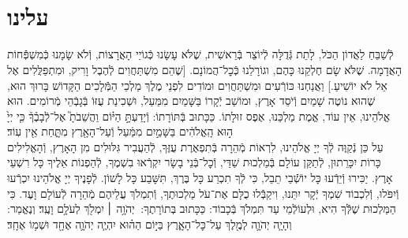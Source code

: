 \documentclass[twoside, openany, parskip=half, 11pt]{book}
\begin{document}
\uvaletzion

\\
\\


\label{end of shacharis}
\fullkaddish

\section*{ עלינו }

\newcommand{\aleinu}{
\firstword{עָלֵֽינוּ}
לְֿשַׁבֵּחַ לַאֲדוֹן הַכֹּל, לָתֵת גְּֿדֻלָּה לְֿיוֹצֵר בְּֿרֵאשִׁית, שֶׁלֹּא עָשָׂנוּ כְּֿגוֹיֵי הָאֲרָצוֹת, וְֿלֹא שָׂמָנוּ כְּֿמִשְׁפְּֿֿֿחוֹת הָאֲדָמָה. שֶׁלֹּא שָׂם חֶלְקֵנוּ כָּהֶם, וגוֹרָלֵנוּ כְּֿכׇל־הֲמוֹנָם. [שֶׁהֵם מִשְׁתַּחֲוִים לְֿהֶבֶל וָרִיק, וּמִתְפַּלֲּלִים אֶל אֵל לֹא יוֹשִׁיעַ.] וַאֲנַחְנוּ כּוֹרְֿעִים וּמִשְׁתַּחֲוִים וּמוֹדִים לִפְנֵי מֶלֶךְ מַלְכֵי הַמְּֿֿלָכִים הַקָּדוֹשׁ בָּרוּךְ הוּא, שֶׁהוּא נוֹטֶה שָׁמַיִם וְֿיֹסֵד אָרֶץ, וּמוֹשַׁב יְֿקָרוֹ בַּשָּׁמַיִם מִמַּעַל, וּשְׁכִינַת עֻזּוֹ בְּֿגָבְֿהֵי מְֿרוֹמִים. הוּא אֱלֹהֵינוּ, אֵין עוֹד, אֱמֶת מַלְכֵּנוּ, אֶפֶס זוּלָתוֹ. כַּכָּתוּב בְּֿתּוֹרָתוֹ: וְֿיָדַעְתָּ֣
\source{דברים ד}
הַיּ֗וֹם וַהֲשֵׁבֹתָ֮ אֶל־לְֿבָבֶ֒ךָ֒ כִּ֤י יְיָ֙ ה֣וּא הָֽאֱלֹהִ֔ים בַּשָּׁמַ֣יִם מִמַּ֔עַל וְֿעַל־הָאָ֖רֶץ מִתָּ֑חַת אֵ֖ין עֽוֹד׃\\
עַל כֵּן נְֿקַוֶּה לְֿךָ יְיָ אֱלֹהֵינוּ, לִרְאוֹת מְֿהֵרָה בְּֿתִפְאֶרֶת עֻזֶּךָ, לְֿהַעֲבִיר גִּלּוּלִים מִן הָאָרֶץ, וְֿהָאֱלִילִים כָּרוֹת יִכָּרֵתוּן, לְֿתַקֵּן עוֹלָם בְּֿמַלְכוּת שַׁדַּי, וְֿכׇל־בְּֿנֵי בָשָׂר יִקְרְֿאוּ בִשְׁמֶךָ, לְֿהַפְנוֹת אֵלֶיךָ כָּל רִשְׁעֵי אָרֶץ. יַכִּירוּ וְֿיֵדְֿעוּ כָּל יוֹשְֿֿׁבֵי תֵבֵל, כִּי לְֿךָ תִכְרַע כָּל בֶּרֶךְ, תִּשָּׁבַע כָּל לָשׁוֹן. לְֿפָנֶיךָ יְיָ אֱלֹהֵינוּ יִכְרְֿעוּ וְֿיִפֹּלוּ, וְֿלִכְבוֹד שִׁמְךָ יְֿקָר יִתֵּנוּ, \adforn{14} וִיקַבְּֿֿלוּ כֻלָּם אֶת־עֹל מַלְכוּתֶךָ, וְֿתִמְלֹךְ עֲלֵיהֶם מְֿהֵרָה לְֿעוֹלָם וָעֶד. כִּי הַמַּלְכוּת שֶׁלְּֿֿךָ הִיא, וּלְעוֹלְֿמֵי עַד תִּמְלֹךְ בְּֿכָבוֹד: כַּכָּתוּב בְּתוֹרָתֶךָ:\source{שמות טו}  יְהֹוָ֥ה ׀ יִמְלֹ֖ךְ לְעֹלָ֥ם וָעֶֽד׃  וְנֶאֱמַר:\source{זכריה יד} וְהָיָ֧ה יְהֹוָ֛ה לְמֶ֖לֶךְ עַל־כׇּל־הָאָ֑רֶץ בַּיּ֣וֹם הַה֗וּא יִהְיֶ֧ה יְהֹוָ֛ה אֶחָ֖ד וּשְׁמ֥וֹ אֶחָֽד׃ 
}

\aleinu
\end{document}
